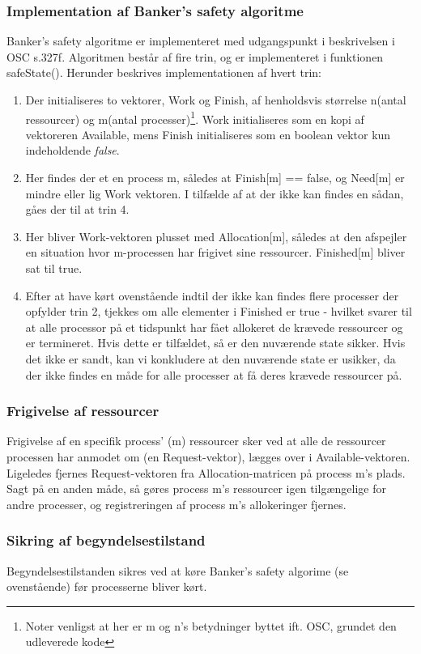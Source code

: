 \subsubsection*{Implementation af Banker's safety algoritme}
Banker's safety algoritme er implementeret med udgangspunkt i beskrivelsen i OSC s.327f. Algoritmen består af fire trin, og er implementeret i funktionen safeState(). Herunder beskrives implementationen af hvert trin:
\begin{enumerate}
	\item Der initialiseres to vektorer, Work og Finish, af henholdsvis størrelse n(antal ressourcer) og m(antal processer)\footnote{Noter venligst at her er m og n's betydninger byttet ift. OSC, grundet den udleverede kode}. Work initialiseres som en kopi af vektoreren Available, mens Finish initialiseres som en boolean vektor kun indeholdende \textit{false}.
	\item Her findes der et en process m, således at Finish[m] == false, og Need[m] er mindre eller lig Work vektoren. I tilfælde af at der ikke kan findes en sådan, gåes der til at trin 4.
	\item Her bliver Work-vektoren plusset med Allocation[m], således at den afspejler en situation hvor m-processen har frigivet sine ressourcer. Finished[m] bliver sat til true.
	\item Efter at have kørt ovenstående indtil der ikke kan findes flere processer der opfylder trin 2, tjekkes om alle elementer i Finished er true - hvilket svarer til at alle processor på et tidspunkt har fået allokeret de krævede ressourcer og er termineret. Hvis dette er tilfældet, så er den nuværende state sikker. Hvis det ikke er sandt, kan vi konkludere at den nuværende state er usikker, da der ikke findes en måde for alle processer at få deres krævede ressourcer på.
\end{enumerate}

\subsubsection*{Frigivelse af ressourcer}
Frigivelse af en specifik process' (m) ressourcer sker ved at alle de ressourcer processen har anmodet om (en Request-vektor), lægges over i Available-vektoren. Ligeledes fjernes Request-vektoren fra Allocation-matricen på process m's plads. Sagt på en anden måde, så gøres process m's ressourcer igen tilgængelige for andre processer, og registreringen af process m's allokeringer fjernes.

\subsubsection*{Sikring af begyndelsestilstand}
Begyndelsestilstanden sikres ved at køre Banker's safety algorime (se ovenstående) før processerne bliver kørt.

